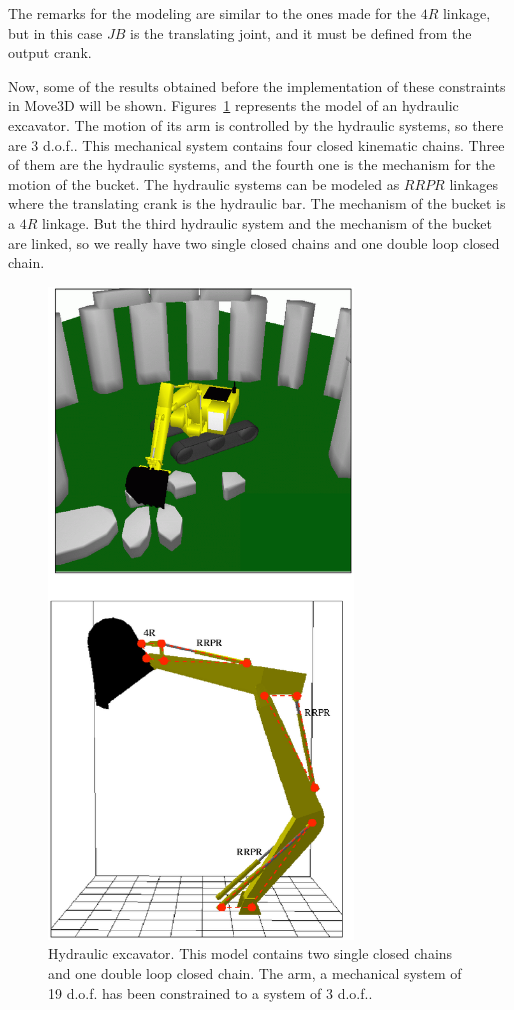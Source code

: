 The remarks for the modeling are similar to the ones made for the
$4R$ linkage, but in this case $JB$ is the translating joint, and it
must be defined from the output crank.

Now, some of the results obtained before the
implementation of these constraints in Move3D will be shown. Figures~\ref{fig:excavator}
represents the model of an hydraulic excavator. The motion of its arm
is controlled by the hydraulic systems, so there are 3 d.o.f.. This
mechanical system contains four closed kinematic chains. Three of them
are the hydraulic systems, and the fourth one is the mechanism for the
motion of the bucket. The hydraulic systems can be modeled as $RRPR$
linkages where the translating crank is the hydraulic bar. The
mechanism of the bucket is a $4R$ linkage. But the third hydraulic
system and the mechanism of the bucket are linked, so we really have
two single closed chains and one double loop closed chain.

\begin{figure}[hb!]
\begin{center}
  \includegraphics[width=8.1cm]{FIG/Constraint/excavator.eps}
\end{center}
\caption{\label{fig:excavator} Hydraulic excavator. This model
contains two single closed chains and one double loop closed chain. The 
arm, a mechanical system of 19 d.o.f. has been constrained to a system of 3 d.o.f..}
\end{figure}


